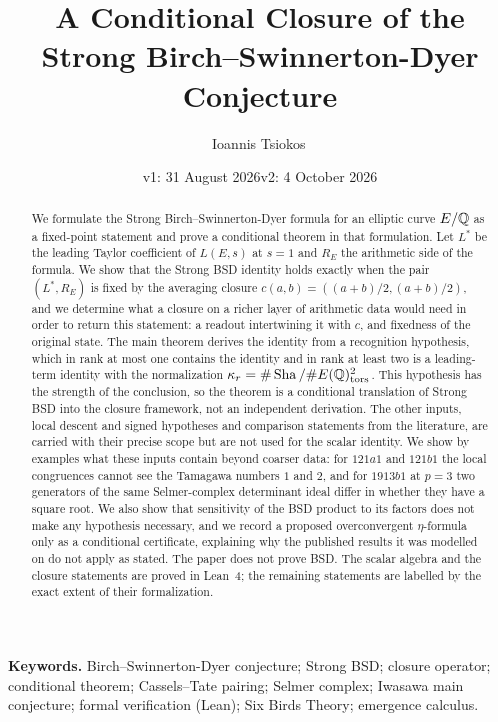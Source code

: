\documentclass[11pt]{article}
\title{A Conditional Closure of the Strong Birch--Swinnerton-Dyer Conjecture}
\author{Ioannis Tsiokos\,\orcidlink{0009-0009-7659-5964}}
\date{v1: 31 August 2026\quad\textperiodcentered\quad v2: 4 October 2026}
\theoremstyle{definition}
\begin{document}
\maketitle
\thispagestyle{firstpage}

\begin{abstract}
We formulate the Strong Birch--Swinnerton-Dyer formula for an elliptic
curve $E/\mathbb{Q}$ as a fixed-point statement and prove a conditional theorem
in that formulation.  Let $L^*$ be the leading Taylor coefficient of
$L(E,s)$ at $s=1$ and $R_E$ the arithmetic side of the formula.  We show
that the Strong BSD identity holds exactly when the pair $(L^*,R_E)$ is
fixed by the averaging closure $c(a,b)=((a+b)/2,(a+b)/2)$, and we
determine what a closure on a richer layer of arithmetic data would need
in order to return this statement: a readout intertwining it with $c$,
and fixedness of the original state.  The main theorem derives the
identity from a recognition hypothesis, which in rank at most one
contains the identity and in rank at least two is a leading-term
identity with the normalization
$\kappa_r=\#\operatorname{Sha}/\#E(\mathbb{Q})_{\mathrm{tors}}^2$.  This hypothesis has the
strength of the conclusion, so the theorem is a conditional translation
of Strong BSD into the closure framework, not an independent derivation.
The other inputs, local descent and signed hypotheses and comparison
statements from the literature, are carried with their precise scope
but are not used for the scalar identity.  We show by examples what these
inputs contain beyond coarser data: for $121a1$ and $121b1$ the local
congruences cannot see the Tamagawa numbers $1$ and $2$, and for $1913b1$
at $p=3$ two generators of the same Selmer-complex determinant ideal
differ in whether they have a square root.  We also show that sensitivity
of the BSD product to its factors does not make any hypothesis necessary,
and we record a proposed overconvergent $\eta$-formula only as a
conditional certificate, explaining why the published results it was
modelled on do not apply as stated.  The paper does not prove BSD.  The
scalar algebra and the closure statements are proved in Lean~4; the
remaining statements are labelled by the exact extent of their
formalization.
\end{abstract}

\medskip
\noindent\textbf{Keywords.} Birch--Swinnerton-Dyer conjecture; Strong BSD;
closure operator; conditional theorem; Cassels--Tate pairing; Selmer
complex; Iwasawa main conjecture; formal verification (Lean); Six Birds
Theory; emergence calculus.
\end{document}

